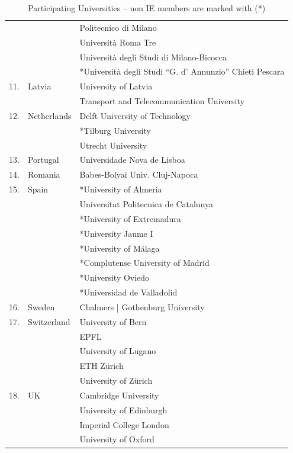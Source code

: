 \documentclass[11pt]{amsart}
\begin{document}
\begin{table}
\begin{center}
\begin{tabular}  {|r|l|l|}
&  & Politecnico di Milano \\
& & Universit\` a Roma Tre \\
&  &  Universit\` a degli Studi di Milano-Bicocca\\
&  & *Universit\` a degli Studi ``G. d' Annunzio'' Chieti Pescara \\
\hline
11.&Latvia   & University of Latvia\\
&  & Transport and Telecommunication University \\
\hline
12.&Netherlands  &  Delft University of Technology\\
& & *Tilburg University \\   
& &  Utrecht University \\
 \hline
13.& Portugal  & Universidade Nova de Lisboa \\
 \hline
14.&Romania  & Babes-Bolyai Univ. Cluj-Napoca \\
\hline
15.&Spain  & *University of Almeria \\
&  & Universitat Politecnica de Catalunya \\
&  &  *University of Extremadura\\
&  &  *University Jaume I\\
&    & *University of M\' alaga \\
&  &  *Complutense University of Madrid\\
&  &  *University Oviedo\\
&  & *Universidad de Valladolid \\
\hline
16.& Sweden   &  Chalmers | Gothenburg University\\
\hline
17.&Switzerland   & University of Bern\\
& & EPFL \\
&  &  University of Lugano \\
 &    & ETH Z\" urich \\
&   &  University of Z\" urich\\
\hline
18.&UK   &  Cambridge University\\
&   &  University of Edinburgh\\
 &  & Imperial College London\\
&  & University of Oxford \\
\hline
\end{tabular}
\vspace*{0.4cm}
\end{center}
\caption{Participating Universities -- non IE members are marked with (*)}
\label{tab:names}
\end{table}



%



\end{document}
